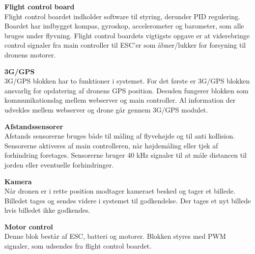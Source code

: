 \textbf{Flight control board}\\
Flight control boardet indholder software til styring, derunder PID regulering. Boardet har indbygget kompas, gyroskop, accelerometer og barometer, som alle bruges under flyvning. Flight control boardets vigtigste opgave er at viderebringe control signaler fra main controller til ESC'er som åbner/lukker for forsyning til dronens motorer. 

\textbf{3G/GPS}\\
3G/GPS blokken har to funktioner i systemet. For det første er 3G/GPS blokken ansvarlig for opdatering af dronens GPS position. Desuden fungerer blokken som kommunikationslag mellem webserver og main controller. Al information der udvekles mellem webserver og drone går gennem 3G/GPS modulet.

\textbf{Afstandssensorer}\\
Afstands sensorerne bruges både til måling af flyvehøjde og til anti kollision. Sensorerne aktiveres af main controlleren, når højdemåling eller tjek af forhindring foretages. Sensorerne bruger 40 kHz signaler til at måle distancen til jorden eller eventuelle forhindringer.

\textbf{Kamera}\\
Når dronen er i rette position modtager kameraet besked og tager et billede. Billedet tages og sendes videre i systemet til godkendelse. Der tages et nyt billede hvis billedet ikke godkendes.

\textbf{Motor control}\\
Denne blok består af ESC, batteri og motorer. Blokken styres med PWM signaler, som udsendes fra flight control boardet.
